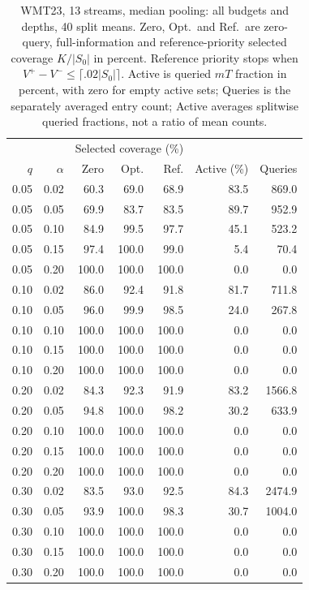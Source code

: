 \begin{table}[t]
\centering\small
\begin{tabular}{rrrrrrr}
\toprule
 & & \multicolumn{3}{c}{Selected coverage (\%)} & & \\
$q$ & $\alpha$ & Zero & Opt. & Ref. & Active (\%) & Queries \\
\midrule
0.05 & 0.02 & 60.3 & 69.0 & 68.9 & 83.5 & 869.0 \\
0.05 & 0.05 & 69.9 & 83.7 & 83.5 & 89.7 & 952.9 \\
0.05 & 0.10 & 84.9 & 99.5 & 97.7 & 45.1 & 523.2 \\
0.05 & 0.15 & 97.4 & 100.0 & 99.0 & 5.4 & 70.4 \\
0.05 & 0.20 & 100.0 & 100.0 & 100.0 & 0.0 & 0.0 \\
0.10 & 0.02 & 86.0 & 92.4 & 91.8 & 81.7 & 711.8 \\
0.10 & 0.05 & 96.0 & 99.9 & 98.5 & 24.0 & 267.8 \\
0.10 & 0.10 & 100.0 & 100.0 & 100.0 & 0.0 & 0.0 \\
0.10 & 0.15 & 100.0 & 100.0 & 100.0 & 0.0 & 0.0 \\
0.10 & 0.20 & 100.0 & 100.0 & 100.0 & 0.0 & 0.0 \\
0.20 & 0.02 & 84.3 & 92.3 & 91.9 & 83.2 & 1566.8 \\
0.20 & 0.05 & 94.8 & 100.0 & 98.2 & 30.2 & 633.9 \\
0.20 & 0.10 & 100.0 & 100.0 & 100.0 & 0.0 & 0.0 \\
0.20 & 0.15 & 100.0 & 100.0 & 100.0 & 0.0 & 0.0 \\
0.20 & 0.20 & 100.0 & 100.0 & 100.0 & 0.0 & 0.0 \\
0.30 & 0.02 & 83.5 & 93.0 & 92.5 & 84.3 & 2474.9 \\
0.30 & 0.05 & 93.9 & 100.0 & 98.3 & 30.7 & 1004.0 \\
0.30 & 0.10 & 100.0 & 100.0 & 100.0 & 0.0 & 0.0 \\
0.30 & 0.15 & 100.0 & 100.0 & 100.0 & 0.0 & 0.0 \\
0.30 & 0.20 & 100.0 & 100.0 & 100.0 & 0.0 & 0.0 \\
\bottomrule
\end{tabular}
\caption{WMT23, 13 streams, median pooling: all budgets and depths, 40 split means. Zero, Opt.\ and Ref.\ are zero-query, full-information and reference-priority selected coverage $K/|S_0|$ in percent. Reference priority stops when $V^+-V^-\le\lceil.02|S_0|\rceil$. Active is queried $mT$ fraction in percent, with zero for empty active sets; Queries is the separately averaged entry count; Active averages splitwise queried fractions, not a ratio of mean counts.}
\label{tab:review-budget-1-median}
\end{table}
